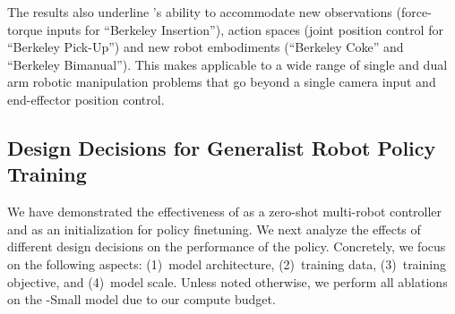 The results also underline \method's ability to accommodate new observations (force-torque inputs for ``Berkeley Insertion''), action spaces (joint position control for ``Berkeley Pick-Up'') and new robot embodiments (``Berkeley Coke'' and ``Berkeley Bimanual''). This makes \method{} applicable to a wide range of single and dual arm robotic manipulation problems that go beyond a single camera input and end-effector position control.



\subsection{Design Decisions for Generalist Robot Policy Training}
\label{sec:ablations}

We have demonstrated the effectiveness of \method{} as a zero-shot multi-robot controller and as an initialization for policy finetuning. We next analyze the effects of different design decisions on the performance of the \method{} policy. Concretely, we focus on the following aspects: (1)~model architecture, (2)~training data, (3)~training objective, and (4)~model scale. Unless noted otherwise, we perform all ablations on the \method{}-Small model due to our compute budget.










